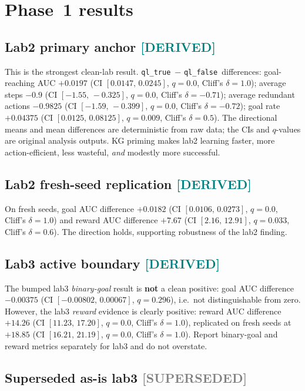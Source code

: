 \documentclass[12pt, a4paper, oneside]{memoir}
\newcommand{\evDerived}{\textcolor{teal}{[DERIVED]}}
\newcommand{\evSuperseded}{\textcolor{gray}{[SUPERSEDED]}}
\newcommand{\qlT}{\texttt{ql\_true}}
\newcommand{\qlF}{\texttt{ql\_false}}
\begin{document}
\section{Phase~1 results}
\label{sec:eval-phase1}

\subsection{Lab2 primary anchor \evDerived}

This is the strongest clean-lab result.  \qlT\ $-$ \qlF\ differences:
goal-reaching AUC $+0.0197$ (CI $[0.0147,\,0.0245]$, $q = 0.0$, Cliff's
$\delta = 1.0$); average steps $-0.9$ (CI $[-1.55,\,-0.325]$, $q = 0.0$,
Cliff's $\delta = -0.71$); average redundant actions $-0.9825$ (CI
$[-1.59,\,-0.399]$, $q = 0.0$, Cliff's $\delta = -0.72$); goal rate
$+0.04375$ (CI $[0.0125,\,0.08125]$, $q = 0.009$, Cliff's $\delta = 0.5$).
The directional means and mean differences are deterministic from raw data;
the CIs and $q$-values are original analysis outputs.  KG priming makes lab2
learning faster, more action-efficient, less wasteful, \emph{and} modestly
more successful.

\subsection{Lab2 fresh-seed replication \evDerived}

On fresh seeds, goal AUC difference $+0.0182$ (CI $[0.0106,\,0.0273]$,
$q = 0.0$, Cliff's $\delta = 1.0$) and reward AUC difference $+7.67$
(CI $[2.16,\,12.91]$, $q = 0.033$, Cliff's $\delta = 0.6$).  The direction
holds, supporting robustness of the lab2 finding.

\subsection{Lab3 active boundary \evDerived}

The bumped lab3 \emph{binary-goal} result is \textbf{not} a clean positive:
goal AUC difference $-0.00375$ (CI $[-0.00802,\,0.00067]$, $q = 0.296$),
i.e.\ not distinguishable from zero.  However, the lab3 \emph{reward}
evidence is clearly positive: reward AUC difference $+14.26$ (CI
$[11.23,\,17.20]$, $q = 0.0$, Cliff's $\delta = 1.0$), replicated on fresh
seeds at $+18.85$ (CI $[16.21,\,21.19]$, $q = 0.0$, Cliff's $\delta = 1.0$).
Report binary-goal and reward metrics separately for lab3 and do not
overstate.

\subsection{Superseded as-is lab3 \evSuperseded}
\end{document}
